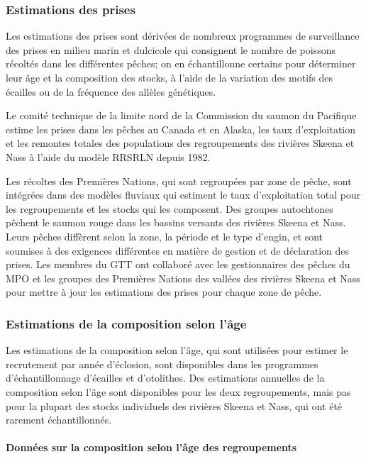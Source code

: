 \documentclass[french,11pt]{book}
\begin{document}
\subsubsection{Estimations des prises}\label{estimations-des-prises}

Les estimations des prises sont dérivées de nombreux programmes de surveillance des prises en milieu marin et dulcicole qui consignent le nombre de poissons récoltés dans les différentes pêches; on en échantillonne certains pour déterminer leur âge et la composition des stocks, à l'aide de la variation des motifs des écailles ou de la fréquence des allèles génétiques.

Le comité technique de la limite nord de la Commission du saumon du Pacifique estime les prises dans les pêches au Canada et en Alaska, les taux d'exploitation et les remontes totales des populations des regroupements des rivières Skeena et Nass à l'aide du modèle RRSRLN depuis 1982.

Les récoltes des Premières Nations, qui sont regroupées par zone de pêche, sont intégrées dans des modèles fluviaux qui estiment le taux d'exploitation total pour les regroupements et les stocks qui les composent. Des groupes autochtones pêchent le saumon rouge dans les bassins versants des rivières Skeena et Nass. Leurs pêches diffèrent selon la zone, la période et le type d'engin, et sont soumises à des exigences différentes en matière de gestion et de déclaration des prises. Les membres du GTT ont collaboré avec les gestionnaires des pêches du MPO et les groupes des Premières Nations des vallées des rivières Skeena et Nass pour mettre à jour les estimations des prises pour chaque zone de pêche.

\subsubsection{Estimations de la composition selon l'âge}\label{estimations-de-la-composition-selon-luxe2ge}

Les estimations de la composition selon l'âge, qui sont utilisées pour estimer le recrutement par année d'éclosion, sont disponibles dans les programmes d'échantillonnage d'écailles et d'otolithes. Des estimations annuelles de la composition selon l'âge sont disponibles pour les deux regroupements, mais pas pour la plupart des stocks individuels des rivières Skeena et Nass, qui ont été rarement échantillonnés.

\paragraph{Données sur la composition selon l'âge des regroupements}\label{donnuxe9es-sur-la-composition-selon-luxe2ge-des-regroupements}
\end{document}
